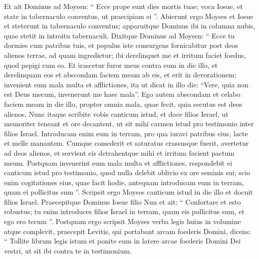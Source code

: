 \begin{biblechapter}
\begin{biblechapter}
\begin{biblechapter}
\begin{biblechapter}
\begin{biblechapter}
\begin{biblechapter}
\begin{biblechapter}
\begin{biblechapter}
\begin{biblechapter}
\begin{biblechapter}
\begin{biblechapter}
\begin{biblechapter}
\begin{biblechapter}
\begin{biblechapter}
\begin{biblechapter}
\begin{biblechapter}
\begin{biblechapter}
\begin{biblechapter}
\begin{biblechapter}
\begin{biblechapter}
\begin{biblechapter}
\begin{biblechapter}
\begin{biblechapter}
\begin{biblechapter}
\begin{biblechapter}
\begin{biblechapter}
\begin{biblechapter}
\begin{biblechapter}
\begin{biblechapter}
\begin{biblechapter}
\begin{biblechapter}
 \verse Et ait Dominus ad Moysen: “ Ecce prope sunt dies mortis tuae; voca Iosue, et state in tabernaculo conventus, ut praecipiam ei ”. Abierunt ergo Moyses et Iosue et steterunt in tabernaculo conventus; 
\verse apparuitque Dominus ibi in columna nubis, quae stetit in introitu tabernaculi.
 \verse Dixitque Dominus ad Moysen: “ Ecce tu dormies cum patribus tuis, et populus iste consurgens fornicabitur post deos alienos terrae, ad quam ingredietur; ibi derelinquet me et irritum faciet foedus, quod pepigi cum eo. 
\verse Et irascetur furor meus contra eum in die illo, et derelinquam eos et abscondam faciem meam ab eis, et erit in devorationem; invenient eum mala multa et afflictiones, ita ut dicat in illo die: “Vere, quia non est Deus mecum, invenerunt me haec mala”. 
\verse Ego autem abscondam et celabo faciem meam in die illo, propter omnia mala, quae fecit, quia secutus est deos alienos.
 \verse Nunc itaque scribite vobis canticum istud, et doce filios Israel, ut memoriter teneant et ore decantent, ut sit mihi carmen istud pro testimonio inter filios Israel. 
\verse Introducam enim eum in terram, pro qua iuravi patribus eius, lacte et melle manantem. Cumque comederit et saturatus crassusque fuerit, avertetur ad deos alienos, et servient eis detrahentque mihi et irritum facient pactum meum. 
\verse Postquam invenerint eum mala multa et afflictiones, respondebit ei canticum istud pro testimonio, quod nulla delebit oblivio ex ore seminis sui; scio enim cogitationes eius, quae facit hodie, antequam introducam eum in terram, quam ei pollicitus sum ”. 
\verse Scripsit ergo Moyses canticum istud in die illo et docuit filios Israel.
 \verse Praecepitque Dominus Iosue filio Nun et ait: “ Confortare et esto robustus; tu enim introduces filios Israel in terram, quam eis pollicitus sum, et ego ero tecum ”.
 \verse Postquam ergo scripsit Moyses verba legis huius in volumine atque complevit, 
\verse praecepit Levitis, qui portabant arcam foederis Domini, dicens: 
\verse “ Tollite librum legis istum et ponite eum in latere arcae foederis Domini Dei vestri, ut sit ibi contra te in testimonium. 

\end{biblechapter}
\end{biblechapter}
\end{biblechapter}
\end{biblechapter}
\end{biblechapter}
\end{biblechapter}
\end{biblechapter}
\end{biblechapter}
\end{biblechapter}
\end{biblechapter}
\end{biblechapter}
\end{biblechapter}
\end{biblechapter}
\end{biblechapter}
\end{biblechapter}
\end{biblechapter}
\end{biblechapter}
\end{biblechapter}
\end{biblechapter}
\end{biblechapter}
\end{biblechapter}
\end{biblechapter}
\end{biblechapter}
\end{biblechapter}
\end{biblechapter}
\end{biblechapter}
\end{biblechapter}
\end{biblechapter}
\end{biblechapter}
\end{biblechapter}
\end{biblechapter}
